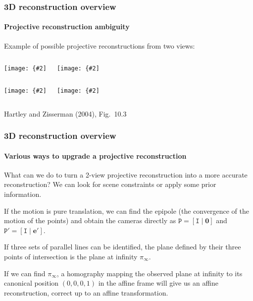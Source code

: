 \documentclass[aspectratio=169]{beamer}
\renewcommand{\vec}[1]{\boldsymbol{#1}}
\newcommand{\mat}[1]{\mathtt{#1}}
\newcommand{\myfig}[3]{\centerline{\texttt{[image: \{\#2]}}}
    \centerline{\scriptsize #3}}
\begin{document}
\begin{frame}
\frametitle{3D reconstruction overview}
\framesubtitle{Projective reconstruction ambiguity}

Example of possible projective reconstructions from two views:

\medskip

\begin{columns}
\column{1.5in}
\myfig{1.4in}{HZ-fig9-3a}{}
\column{1.5in}
\myfig{1.4in}{HZ-fig9-3b}{}
\end{columns}

\begin{columns}
\column{1.5in}
\myfig{1.4in}{HZ-fig9-3c}{}
\column{1.5in}
\myfig{1.4in}{HZ-fig9-3d}{}
\end{columns}

\centerline{\scriptsize Hartley and Zisserman (2004), Fig.\ 10.3}

\end{frame}

\begin{frame}
\frametitle{3D reconstruction overview}
\framesubtitle{Various ways to upgrade a projective reconstruction}

What can we do to turn a 2-view projective reconstruction into a more
accurate reconstruction?  We can
look for \alert{scene constraints} or apply some \alert{prior
  information}.

\medskip

If the motion is \alert{pure translation}, we can find the epipole
(the convergence of the motion of the points) and obtain the cameras
directly as $\mat{P}=[\mat{I}\mid\vec{0}]$ and
$\mat{P}'=[\mat{I}\mid\vec{e}']$.

\medskip

If \alert{three sets of parallel lines} can be identified, the plane
defined by their three points of intersection is the \alert{plane at
infinity} $\pi_{\infty}$.

\medskip

If we can find $\pi_{\infty}$, a homography mapping the
observed plane at infinity to its
canonical position $(0,0,0,1)$ in the affine frame will
give us an \alert{affine reconstruction}, correct up to an affine
transformation.

\end{frame}
\end{document}
